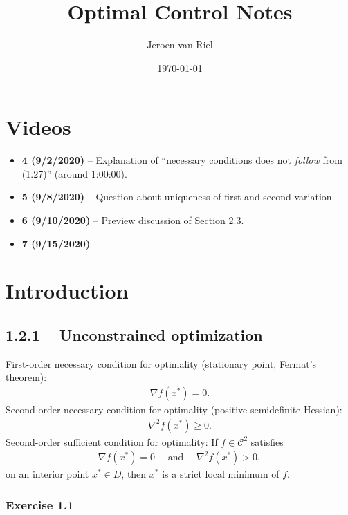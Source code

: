\documentclass[a4paper]{article}
\author{Jeroen van Riel}
\date{\monthyeardate\today}
\title{Optimal Control Notes}
\begin{document}
\section*{Videos}

\begin{itemize}
  \item \textbf{4 (9/2/2020)} -- Explanation of ``necessary conditions does not \textit{follow} from (1.27)'' (around 1:00:00).
  \item \textbf{5 (9/8/2020)} -- Question about uniqueness of first and second variation.
  \item \textbf{6 (9/10/2020)} -- Preview discussion of Section 2.3.
  \item \textbf{7 (9/15/2020)} --
\end{itemize}



\section{Introduction}

\subsection*{1.2.1 -- Unconstrained optimization}

First-order necessary condition for optimality (stationary point, Fermat's theorem):
\begin{align*}
  \nabla f(x^{*}) = 0 .
\end{align*}
%
Second-order necessary condition for optimality (positive semidefinite Hessian):
\begin{align*}
  \nabla^{2} f(x^{*}) \geq 0 .
\end{align*}
%
Second-order sufficient condition for optimality:
If $f \in \mathcal{C}^{2}$ satisfies
\begin{align*}
  \nabla f(x^{*}) = 0 \quad \text{ and } \quad \nabla^{2} f(x^{*}) > 0 ,
\end{align*}
on an interior point $x^{*} \in D$, then $x^{*}$ is a strict local minimum of
$f$.


\subsubsection*{Exercise 1.1}
\end{document}
